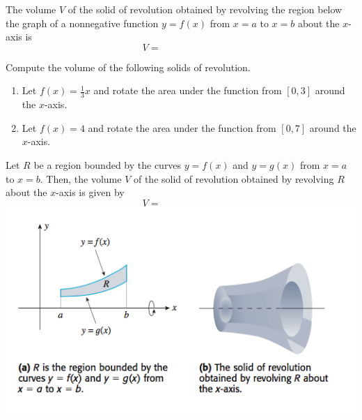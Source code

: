 \documentclass[12pt, a4paper]{article}
\begin{document}
\begin{thrm}
  The volume \(V\) of the solid of revolution obtained by revolving
  the region below the graph of a nonnegative function \(y=f(x)\) from
  \(x=a\) to \(x=b\) about the \(x\)-axis is \[
    V = \hspace{1in}
  \]
\end{thrm}
\vspace{-0.5in}
\begin{ex}
  Compute the volume of the following solids of revolution.
  \begin{enumerate}
  \item Let \(f(x) = \frac{1}{3}x\) and rotate the area under the
    function from \([0,3]\) around the \(x\)-axis.
    \vspace{2in}
  \item Let \(f(x) = 4\) and rotate the area under the function from
    \([0,7]\) around the \(x\)-axis.
  \end{enumerate}
\end{ex}
\begin{thrm}
  Let \(R\) be a region bounded by the curves \(y=f(x)\) and
  \(y=g(x)\) from \(x=a\) to \(x=b\). Then, the volume \(V\) of the
  solid of revolution obtained by revolving \(R\) about the
  \(x\)-axis is given by \[
    V = \hspace{1in}
  \]
  \includegraphics[scale=0.5]{images/surface-of-revolution2}
\end{thrm}
\end{document}
